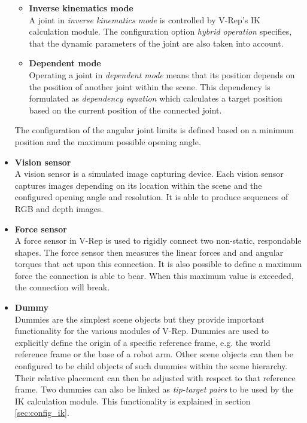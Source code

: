 \begin{itemize}
\begin{itemize}
\item \textbf{Inverse kinematics mode} \\
A joint in \emph{inverse kinematics mode} is controlled by V-Rep's IK calculation module. The configuration option \emph{hybrid operation} specifies, that the dynamic parameters of the joint are also taken into account.

\item \textbf{Dependent mode} \\
Operating a joint in \emph{dependent mode} means that its position depends on the position of another joint within the scene. This dependency is formulated as \emph{dependency equation} which calculates a target position based on the current position of the connected joint.

\end{itemize}
The configuration of the angular joint limits is defined based on a minimum position and the maximum possible opening angle. 

\item \textbf{Vision sensor} \\
A vision sensor is a simulated image capturing device. Each vision sensor captures images depending on its location within the scene and the configured opening angle and resolution. It is able to produce sequences of RGB and depth images.

\item \textbf{Force sensor} \\
A force sensor in V-Rep is used to rigidly connect two non-static, respondable shapes. The force sensor then measures the linear forces and and angular torques that act upon this connection. It is also possible to define a maximum force the connection is able to bear. When this maximum value is exceeded, the connection will break.

\item \textbf{Dummy} \\
Dummies are the simplest scene objects but they provide important functionality for the various modules of V-Rep. Dummies are used to explicitly define the origin of a specific reference frame, e.g. the world reference frame or the base of a robot arm. Other scene objects can then be configured to be child objects of such dummies within the scene hierarchy. Their relative placement can then be adjusted with respect to that reference frame. Two dummies can also be linked as \emph{tip-target pairs} to be used by the IK calculation module. This functionality is explained in section \ref{sec:config_ik}.

\end{itemize}

